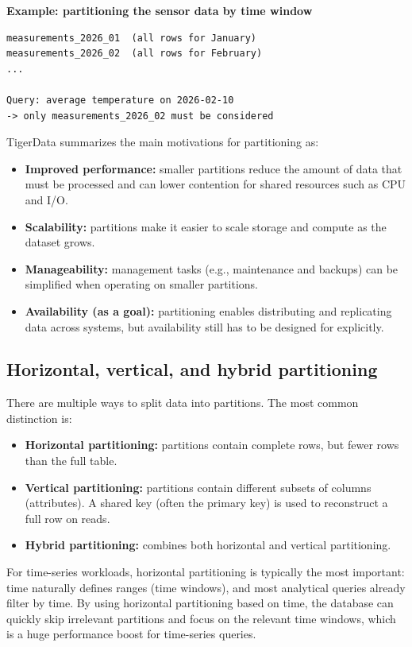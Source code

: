 \textbf{Example: partitioning the sensor data by time window}
\begin{verbatim}
measurements_2026_01  (all rows for January)
measurements_2026_02  (all rows for February)
...

Query: average temperature on 2026-02-10
-> only measurements_2026_02 must be considered
\end{verbatim}

TigerData summarizes the main motivations for partitioning as:
\begin{itemize}
  \item \textbf{Improved performance:} smaller partitions reduce the amount of data that must be processed and can lower contention for shared resources such as CPU and I/O.\cite{TigerData:01}
  \item \textbf{Scalability:} partitions make it easier to scale storage and compute as the dataset grows.\cite{TigerData:01}
  \item \textbf{Manageability:} management tasks (e.g., maintenance and backups) can be simplified when operating on smaller partitions.\cite{TigerData:01}
  \item \textbf{Availability (as a goal):} partitioning enables distributing and replicating data across systems, but availability still has to be designed for explicitly.\cite{TigerData:01}
\end{itemize}

\subsection{Horizontal, vertical, and hybrid partitioning}

There are multiple ways to split data into partitions. The most common
distinction is:

\begin{itemize}
  \item \textbf{Horizontal partitioning:} partitions contain complete rows, but fewer rows than the full table.
  \item \textbf{Vertical partitioning:} partitions contain different subsets of columns (attributes). A shared key (often the primary key) is used to reconstruct a full row on reads.
  \item \textbf{Hybrid partitioning:} combines both horizontal and vertical partitioning.
\end{itemize}

\noindent\cite{TigerData:01}

For time-series workloads, horizontal partitioning is typically the most
important: time naturally defines ranges (time windows), and most analytical
queries already filter by time. By using horizontal partitioning based on time,
the database can quickly skip irrelevant partitions and focus on the relevant
time windows, which is a huge performance boost for time-series
queries.\cite{TigerData:01}